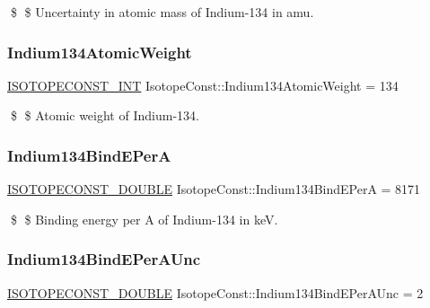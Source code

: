 \$ \$ Uncertainty in atomic mass of Indium-\/134 in amu. \mbox{\label{group___isotope_const-_indium-_in134_ga17d4fb0dd73cccdfe206dd7cbe8c1ff8}} 
\subsubsection{\texorpdfstring{Indium134\+Atomic\+Weight}{Indium134AtomicWeight}}
{\footnotesize\ttfamily \mbox{\hyperlink{group___isotope_const-_macros_ga5f18360b3e99483a35c32d789e62621c}{I\+S\+O\+T\+O\+P\+E\+C\+O\+N\+S\+T\+\_\+\+I\+NT}} Isotope\+Const\+::\+Indium134\+Atomic\+Weight = 134}

\$ \$ Atomic weight of Indium-\/134. \mbox{\label{group___isotope_const-_indium-_in134_ga32c2bea02b45475d76dfb9ca5b9c2cbc}} 
\subsubsection{\texorpdfstring{Indium134\+Bind\+E\+PerA}{Indium134BindEPerA}}
{\footnotesize\ttfamily \mbox{\hyperlink{group___isotope_const-_macros_ga8f45a7272ce02c0b4c65c44636ed719a}{I\+S\+O\+T\+O\+P\+E\+C\+O\+N\+S\+T\+\_\+\+D\+O\+U\+B\+LE}} Isotope\+Const\+::\+Indium134\+Bind\+E\+PerA = 8171}

\$ \$ Binding energy per A of Indium-\/134 in keV. \mbox{\label{group___isotope_const-_indium-_in134_gac3781f3f826f5a47e786ccca5c369a87}} 
\subsubsection{\texorpdfstring{Indium134\+Bind\+E\+Per\+A\+Unc}{Indium134BindEPerAUnc}}
{\footnotesize\ttfamily \mbox{\hyperlink{group___isotope_const-_macros_ga8f45a7272ce02c0b4c65c44636ed719a}{I\+S\+O\+T\+O\+P\+E\+C\+O\+N\+S\+T\+\_\+\+D\+O\+U\+B\+LE}} Isotope\+Const\+::\+Indium134\+Bind\+E\+Per\+A\+Unc = 2}

